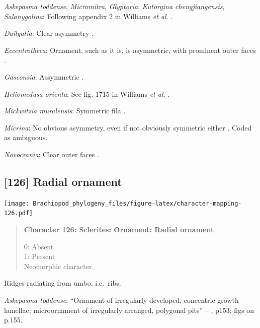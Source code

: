 \documentclass[openany]{book}
\begin{document}
\hypertarget{Askepasma_toddense-coding-125}{}
\emph{Askepasma toddense}, \emph{Micromitra}, \emph{Glyptoria},
\emph{Kutorgina chengjiangensis}, \emph{Salanygolina}: Following
appendix 2 in Williams \emph{et al}.
\citeyearpar{Williams1998Thediversity}.

\hypertarget{Dailyatia-coding-125}{}
\emph{Dailyatia}: Clear asymmetry \citep{Skovsted2015Theearly}.

\hypertarget{Eccentrotheca-coding-125}{}
\emph{Eccentrotheca}: Ornament, such as it is, is asymmetric, with
prominent outer faces \citep{Skovsted2011Scleritomeconstruction}.

\hypertarget{Gasconsia-coding-125}{}
\emph{Gasconsia}: Assymmetric \citep[fig. 3]{Hanken1985Thetaxonomy}.

\hypertarget{Heliomedusa_orienta-coding-125}{}
\emph{Heliomedusa orienta}: See fig. 1715 in Williams \emph{et al}.
\citeyearpar{Williams2007Supplement}.

\hypertarget{Mickwitzia_muralensis-coding-125}{}
\emph{Mickwitzia muralensis}: Symmetric fila
\citep{Balthasar2004Shellstructure}.

\hypertarget{Micrina-coding-125}{}
\emph{Micrina}: No obvious asymmetry, even if not obviously symmetric
either \citep{Holmer2008TheEarly}. Coded as ambiguous.

\hypertarget{Novocrania-coding-125}{}
\emph{Novocrania}: Clear outer faces \citep[fig.
100.2b]{Williams2000LinguliformeaCraniiformea}.

\subsection*{{[}126{]} Radial ornament}\label{radial-ornament}

\texttt{[image: Brachiopod\_phylogeny\_files/figure-latex/character-mapping-126.pdf]}

\begin{quote}
\textbf{Character 126: Sclerites: Ornament: Radial ornament}

0: Absent\\
1: Present\\
Neomorphic character.
\end{quote}

Ridges radiating from umbo, i.e.~ribs.

\hypertarget{Askepasma_toddense-coding-126}{}
\emph{Askepasma toddense}: ``Ornament of irregularly developed,
concentric growth lamellae; microornament of irregularly arranged,
polygonal pits'' -- \citet{Williams2000LinguliformeaCraniiformea}, p153;
figs on p.155.
\end{document}

